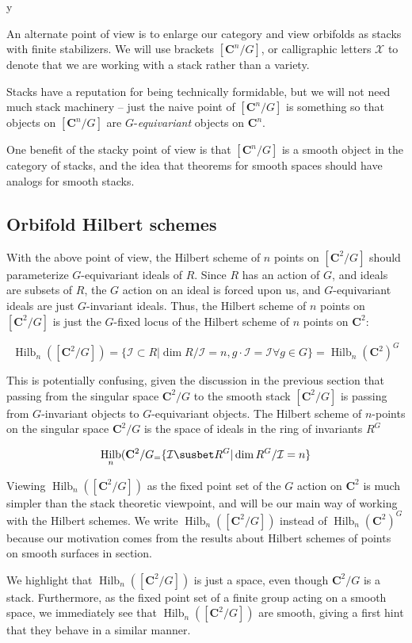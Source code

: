 y\documentclass{amsart}[12pt]
\theoremstyle{definition}
\newcommand{\C}{\mathbf{C}}
\DeclareMathOperator{\Hilb}{Hilb}
\begin{document}
An alternate point of view is to enlarge our category and view orbifolds as stacks with finite stabilizers.  We will use brackets $[\C^n/G]$, or calligraphic letters $\mathcal{X}$ to denote that we are working with a stack rather than a variety.  

Stacks have a reputation for being technically formidable, but we will not need much stack machinery -- just the naive point of $[\C^n/G]$ is something so that objects on $[\C^n/G]$ are $G$-\emph{equivariant} objects on $\C^n$.  


One benefit of the stacky point of view is that $[\C^n/G]$ is a smooth object in the category of stacks, and the idea that theorems for smooth spaces should have analogs for smooth stacks.


\subsection{Orbifold Hilbert schemes}

With the above point of view, the Hilbert scheme of $n$ points on $[\C^2/G]$ should parameterize $G$-equivariant ideals of $R$.  Since $R$ has an action of $G$, and ideals are subsets of $R$, the $G$ action on an ideal is forced upon us, and $G$-equivariant ideals are just $G$-invariant ideals.  Thus, the Hilbert scheme of $n$ points on $[\C^2/G]$ is just the $G$-fixed locus of the Hilbert scheme of $n$ points on $\C^2$:

$$\Hilb_n([\C^2/G])=\{\mathcal{I}\subset R |\dim R/\mathcal{I}=n, g\cdot \mathcal{I}=\mathcal{I}\forall g\in G \} =\Hilb_n(\C^2)^G$$

This is potentially confusing, given the discussion in the previous section that passing from the singular space $\C^2/G$ to the smooth stack $[\C^2/G]$ is passing from $G$-invariant objects to $G$-equivariant objects.  The Hilbert scheme of $n$-points on the singular space $\C^2/G$ is the space of ideals in the ring of invariants $R^G$

$$\Hilb_n(\C^2/G_=\{\mathcal{I}\susbet R^G | \dim R^G/\mathcal{I}=n\}$$


Viewing $\Hilb_n([\C^2/G])$ as the fixed point set of the $G$ action on $\C^2$ is much simpler than the stack theoretic viewpoint, and will be our main way of working with the Hilbert schemes.  We write $\Hilb_n([\C^2/G])$ instead of $\Hilb_n(\C^2)^G$ because our motivation comes from the results about Hilbert schemes of points on smooth surfaces in section.


We highlight that $\Hilb_n([\C^2/G])$ is just a space, even though $\C^2/G$ is a stack.  Furthermore, as the fixed point set of a finite group acting on a smooth space, we immediately see that $\Hilb_n([\C^2/G])$ are smooth, giving a first hint that they behave in a similar manner.
\end{document}
